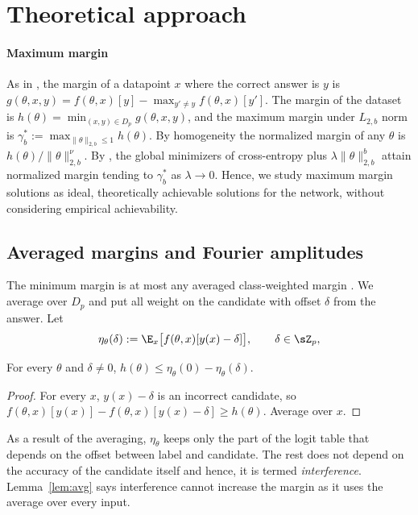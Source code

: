 \section{Theoretical approach}\label{sec:approach}

\paragraph{Maximum margin} As in \citet{morwani2024feature}, the margin of a datapoint $x$ where the correct answer is $y$ is $g(\theta,x,y)=f(\theta,x)[y]-\max_{y'\neq y}f(\theta,x)[y']$. 
The margin of the dataset is $h(\theta)=\min_{(x,y)\in D_p}g(\theta,x,y)$, and the maximum margin under $L_{2,b}$ norm is $\gamma^*_b:=\max_{\|\theta\|_{2,b}\le1}h(\theta)$. 
By homogeneity the normalized margin of any $\theta$ is $h(\theta)/\|\theta\|_{2,b}^\nu$. 
By \citet[Theorem~4.1]{wei2019regularization}, the global minimizers of cross-entropy plus $\lambda\|\theta\|_{2,b}^b$ attain normalized margin tending to $\gamma^*_b$ as $\lambda\to0$.
Hence, we study maximum margin solutions as ideal, theoretically achievable solutions for the network, without considering empirical achievability. 

\subsection{Averaged margins and Fourier amplitudes}\label{sec:avg}

The minimum margin is at most any averaged class-weighted margin \citep[Section~3]{morwani2024feature}. We average over $D_p$ and put all weight on the candidate with offset $\delta$ from the answer. Let
\[
\eta_\theta(\delta):=\E_x\big[f(\theta,x)[y(x)-\delta]\big],\qquad\delta\in\sZ_p,
\]

\begin{lemma}\label{lem:avg}
For every $\theta$ and $\delta\neq0$, $h(\theta)\le\eta_\theta(0)-\eta_\theta(\delta)$.
\end{lemma}
\begin{proof}
For every $x$, $y(x)-\delta$ is an incorrect candidate, so $f(\theta,x)[y(x)]-f(\theta,x)[y(x)-\delta]\ge h(\theta)$. Average over $x$.
\end{proof}

As a result of the averaging, $\eta_\theta$ keeps only the part of the logit table that depends on the offset between label and candidate. The rest does not depend on the accuracy of the candidate itself and hence, it is termed \emph{interference}. Lemma~\ref{lem:avg} says interference cannot increase the margin as it uses the average over every input.

